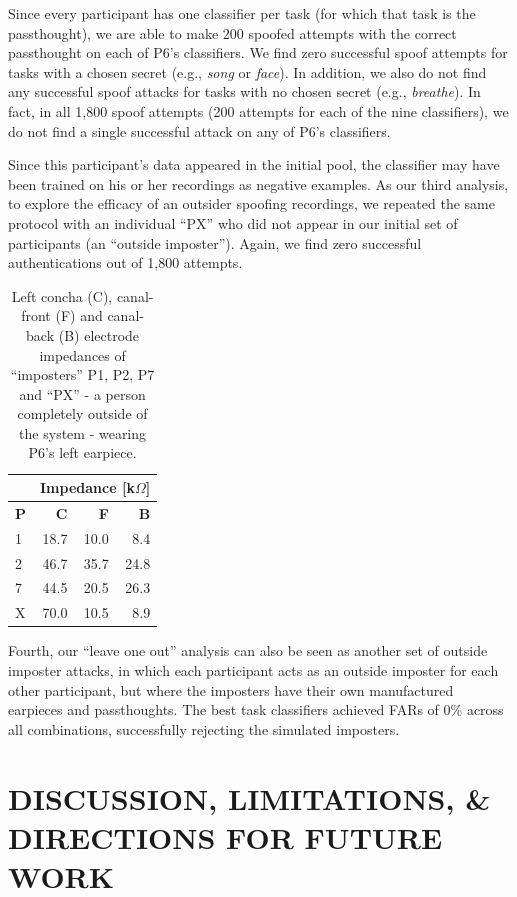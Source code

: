 \documentclass[a4paper,twoside]{article}
\begin{document}
Since every participant has one classifier per task (for which that task is the passthought), we are able to make 200 spoofed attempts with the correct passthought on each of P6's classifiers. We find zero successful spoof attempts for tasks with a chosen secret (e.g., \textit{song} or \textit{face}). In addition, we also do not find any successful spoof attacks for tasks with no chosen secret (e.g., \textit{breathe}). In fact, in all 1,800 spoof attempts (200 attempts for each of the nine classifiers), we do not find a single successful attack on any of P6's classifiers.

Since this participant's data appeared in the initial pool, the classifier may have been trained on his or her recordings as negative examples. As our third analysis, to explore the efficacy of an outsider spoofing recordings, we repeated the same protocol with an individual ``PX'' who did not appear in our initial set of participants (an ``outside imposter''). Again, we find zero successful authentications out of 1,800 attempts.

\begin{table}
\caption{Left concha (C), canal-front (F) and canal-back (B) electrode impedances of ``imposters'' P1, P2, P7 and ``PX'' - a person completely outside of the system - wearing P6's left earpiece.}
\label{tab:imposter_impedances}
\begin{center}
\begin{tabular}{lrrr}
& \multicolumn{3}{c}{Impedance [k\(\Omega\)]} \\
\hline
\textbf{P} & \textbf{C} & \textbf{F} & \textbf{B} \\
\hline
1 & 18.7 & 10.0 & 8.4\\
2 & 46.7 & 35.7 & 24.8\\
7 & 44.5 & 20.5 & 26.3\\
X & 70.0 & 10.5 & 8.9\\
\hline
\end{tabular}
\end{center}
\end{table}

Fourth, our ``leave one out'' analysis can also be seen as another set of outside imposter attacks, in which each participant acts as an outside imposter for each other participant, but where the imposters have their own manufactured earpieces and passthoughts. The best task classifiers achieved FARs of 0\% across all combinations, successfully rejecting the simulated imposters.

\section{\uppercase{Discussion, Limitations, \& Directions for Future Work}}
\label{sec:discussion}
\end{document}
